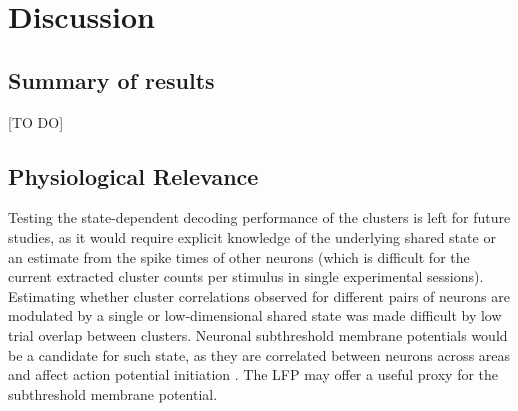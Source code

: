 \documentclass{article}
\begin{document}





\section{Discussion}

\subsection*{Summary of results}
[TO DO]


\subsection*{Physiological Relevance}
Testing the state-dependent decoding performance of the clusters is left for future studies, as it would require explicit knowledge of the underlying shared state or an estimate from the spike times of other neurons (which is difficult for the current extracted cluster counts per stimulus in single experimental sessions).
Estimating whether cluster correlations observed for different pairs of neurons are modulated by a single or low-dimensional shared state was made difficult by low trial overlap between clusters. 
Neuronal subthreshold membrane potentials would be a candidate for such state, as they are correlated between neurons across areas \cite{poulet2008internal} and affect action potential initiation \cite{petersen2003interaction}. The LFP may offer a useful proxy for the subthreshold membrane potential.
\end{document}
